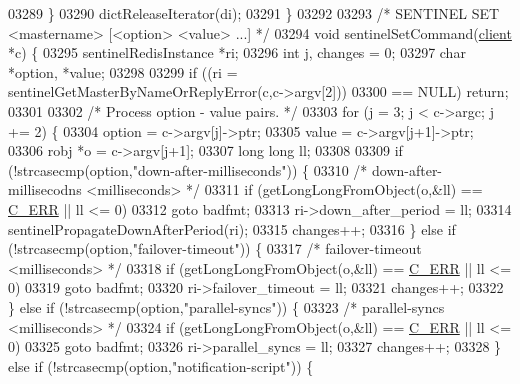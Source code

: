 \begin{DoxyCode}
{{{{{{{{{{{{{{{{{{{{{{{{{{{{{{{{{{{{{{{{{{{{{{{{{{{{{{{{{{{{{{{{{{{{{{{03289     \}
03290     dictReleaseIterator(di);
03291 \}
03292 
03293 \textcolor{comment}{/* SENTINEL SET <mastername> [<option> <value> ...] */}
03294 \textcolor{keywordtype}{void} sentinelSetCommand(\hyperlink{structclient}{client} *c) \{
03295     sentinelRedisInstance *ri;
03296     \textcolor{keywordtype}{int} j, changes = 0;
03297     \textcolor{keywordtype}{char} *option, *value;
03298 
03299     \textcolor{keywordflow}{if} ((ri = sentinelGetMasterByNameOrReplyError(c,c->argv[2]))
03300         == NULL) \textcolor{keywordflow}{return};
03301 
03302     \textcolor{comment}{/* Process option - value pairs. */}
03303     \textcolor{keywordflow}{for} (j = 3; j < c->argc; j += 2) \{
03304         option = c->argv[j]->ptr;
03305         value = c->argv[j+1]->ptr;
03306         robj *o = c->argv[j+1];
03307         \textcolor{keywordtype}{long} \textcolor{keywordtype}{long} ll;
03308 
03309         \textcolor{keywordflow}{if} (!strcasecmp(option,\textcolor{stringliteral}{"down-after-milliseconds"})) \{
03310             \textcolor{comment}{/* down-after-millisecodns <milliseconds> */}
03311             \textcolor{keywordflow}{if} (getLongLongFromObject(o,&ll) == \hyperlink{server_8h_af98ac28d5f4d23d7ed5985188e6fb7d1}{C\_ERR} || ll <= 0)
03312                 \textcolor{keywordflow}{goto} badfmt;
03313             ri->down\_after\_period = ll;
03314             sentinelPropagateDownAfterPeriod(ri);
03315             changes++;
03316         \} \textcolor{keywordflow}{else} \textcolor{keywordflow}{if} (!strcasecmp(option,\textcolor{stringliteral}{"failover-timeout"})) \{
03317             \textcolor{comment}{/* failover-timeout <milliseconds> */}
03318             \textcolor{keywordflow}{if} (getLongLongFromObject(o,&ll) == \hyperlink{server_8h_af98ac28d5f4d23d7ed5985188e6fb7d1}{C\_ERR} || ll <= 0)
03319                 \textcolor{keywordflow}{goto} badfmt;
03320             ri->failover\_timeout = ll;
03321             changes++;
03322        \} \textcolor{keywordflow}{else} \textcolor{keywordflow}{if} (!strcasecmp(option,\textcolor{stringliteral}{"parallel-syncs"})) \{
03323             \textcolor{comment}{/* parallel-syncs <milliseconds> */}
03324             \textcolor{keywordflow}{if} (getLongLongFromObject(o,&ll) == \hyperlink{server_8h_af98ac28d5f4d23d7ed5985188e6fb7d1}{C\_ERR} || ll <= 0)
03325                 \textcolor{keywordflow}{goto} badfmt;
03326             ri->parallel\_syncs = ll;
03327             changes++;
03328        \} \textcolor{keywordflow}{else} \textcolor{keywordflow}{if} (!strcasecmp(option,\textcolor{stringliteral}{"notification-script"})) \{
}}}}}}}}}}}}}}}}}}}}}}}}}}}}}}}}}}}}}}}}}}}}}}}}}}}}}}}}}}}}}}}}}}}}}}}
\end{DoxyCode}
